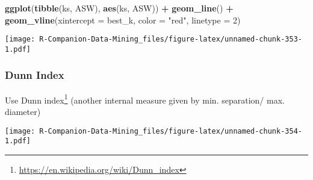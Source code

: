 \documentclass[
  notitlepage]{book}
\newenvironment{Shaded}{\begin{snugshade}}{\end{snugshade}}
\newcommand{\ControlFlowTok}[1]{\textcolor[rgb]{0.13,0.29,0.53}{\textbf{#1}}}
\newcommand{\DataTypeTok}[1]{\textcolor[rgb]{0.13,0.29,0.53}{#1}}
\newcommand{\DecValTok}[1]{\textcolor[rgb]{0.00,0.00,0.81}{#1}}
\newcommand{\KeywordTok}[1]{\textcolor[rgb]{0.13,0.29,0.53}{\textbf{#1}}}
\newcommand{\NormalTok}[1]{#1}
\newcommand{\OperatorTok}[1]{\textcolor[rgb]{0.81,0.36,0.00}{\textbf{#1}}}
\newcommand{\StringTok}[1]{\textcolor[rgb]{0.31,0.60,0.02}{#1}}
\DeclareRobustCommand{\href}[2]{#2\footnote{\url{#1}}}
\begin{document}
\begin{Shaded}
\begin{Highlighting}[]
\KeywordTok{ggplot}\NormalTok{(}\KeywordTok{tibble}\NormalTok{(ks, ASW), }\KeywordTok{aes}\NormalTok{(ks, ASW)) }\OperatorTok{+}\StringTok{ }
\StringTok{  }\KeywordTok{geom\_line}\NormalTok{() }\OperatorTok{+}
\StringTok{  }\KeywordTok{geom\_vline}\NormalTok{(}\DataTypeTok{xintercept =}\NormalTok{ best\_k, }\DataTypeTok{color =} \StringTok{"red"}\NormalTok{, }\DataTypeTok{linetype =} \DecValTok{2}\NormalTok{)}
\end{Highlighting}
\end{Shaded}

\texttt{[image: R-Companion-Data-Mining\_files/figure-latex/unnamed-chunk-353-1.pdf]}

\hypertarget{dunn-index}{%
\subsubsection{Dunn Index}\label{dunn-index}}

Use \href{https://en.wikipedia.org/wiki/Dunn_index}{Dunn index} (another
internal measure given by min. separation/ max. diameter)

\begin{Shaded}
\end{Shaded}

\texttt{[image: R-Companion-Data-Mining\_files/figure-latex/unnamed-chunk-354-1.pdf]}
\end{document}
